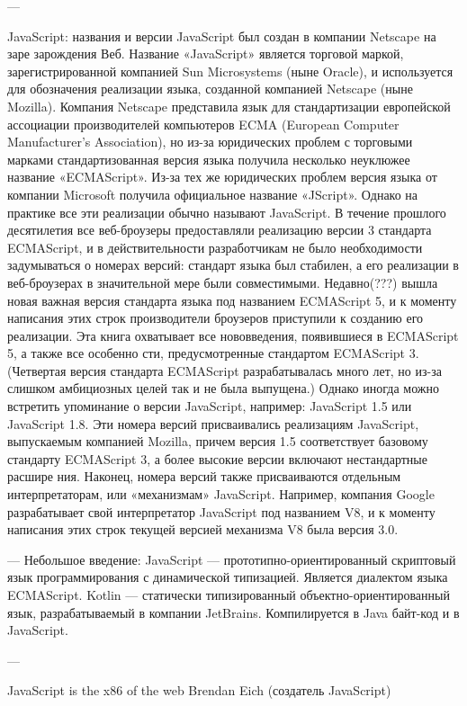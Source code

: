 ---

JavaScript: названия и версии
JavaScript был создан в компании Netscape на заре зарождения Веб. Название «JavaScript» является торговой маркой, зарегистрированной компанией Sun Microsystems (ныне Oracle), и  используется для обозначения реализации языка, созданной компанией Netscape (ныне Mozilla). Компания Netscape представила язык для стандартизации европейской ассоциации производителей компьютеров ECMA (European Computer Manufacturer’s Association), но из-за юридических проблем с торговыми марками стандартизованная версия языка получила несколько неуклюжее название «ECMAScript». Из-за тех же юридических проблем версия языка от компании Microsoft получила официальное название «JScript». Однако на практике все эти реализации обычно называют JavaScript. В течение прошлого десятилетия все веб-броузеры предоставляли реализацию версии 3 стандарта ECMAScript, и в действительности разработчикам не было необходимости задумываться о номерах версий: стандарт языка был стабилен, а его реализации в веб-броузерах в значительной мере были совместимыми. Недавно(???) вышла новая важная версия стандарта языка под названием ECMAScript 5, и к моменту написания этих строк производители броузеров приступили к созданию его реализации. Эта книга охватывает все нововведения, появившиеся в ECMAScript 5, а также все особенно
сти, предусмотренные стандартом ECMAScript 3. (Четвертая версия стандарта ECMAScript разрабатывалась много лет, но из-за слишком амбициозных целей так и не была выпущена.) Однако иногда можно встретить упоминание о версии JavaScript, например: JavaScript 1.5 или JavaScript 1.8. Эти номера версий присваивались реализациям JavaScript, выпускаемым компанией Mozilla, причем версия 1.5 соответствует базовому стандарту ECMAScript 3, а более высокие версии включают нестандартные расшире
ния. Наконец, номера версий также присваиваются отдельным интерпретаторам, или «механизмам» JavaScript. Например, компания Google разрабатывает свой интерпретатор JavaScript под названием V8, и к моменту написания этих строк текущей версией механизма V8 была версия 3.0.\cite{JsDef6}


---
Небольшое введение:
JavaScript — прототипно-ориентированный скриптовый язык программирования с динамической типизацией. Является диалектом языка ECMAScript.
Kotlin — статически типизированный объектно-ориентированный язык, разрабатываемый в компании JetBrains. Компилируется в Java байт-код и в JavaScript.

---

JavaScript is the x86 of the web
Brendan Eich (создатель JavaScript)

